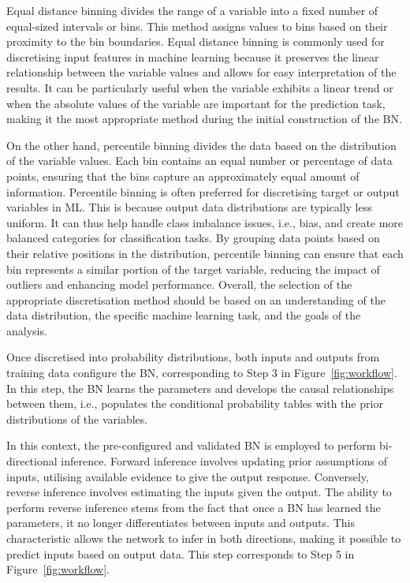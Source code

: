 \documentclass[journal]{IEEEtran}
\begin{document}
Equal distance binning divides the range of a variable into a fixed number of equal-sized intervals or bins. This method assigns values to bins based on their proximity to the bin boundaries. Equal distance binning is commonly used for discretising input features in machine learning because it preserves the linear relationship between the variable values and allows for easy interpretation of the results. It can be particularly useful when the variable exhibits a linear trend or when the absolute values of the variable are important for the prediction task, making it the most appropriate method during the initial construction of the BN. 

On the other hand, percentile binning divides the data based on the distribution of the variable values. Each bin contains an equal number or percentage of data points, ensuring that the bins capture an approximately equal amount of information. Percentile binning is often preferred for discretising target or output variables in ML. This is because output data distributions are typically less uniform. It can thus help handle class imbalance issues, i.e., bias, and create more balanced categories for classification tasks. By grouping data points based on their relative positions in the distribution, percentile binning can ensure that each bin represents a similar portion of the target variable, reducing the impact of outliers and enhancing model performance. Overall, the selection of the appropriate discretisation method should be based on an understanding of the data distribution, the specific machine learning task, and the goals of the analysis. 

Once discretised into probability distributions, both inputs and outputs from training data configure the BN, corresponding to Step 3 in Figure~\ref{fig:workflow}. In this step, the BN learns the parameters and develops the causal relationships between them, i.e., populates the conditional probability tables with the prior distributions of the variables. 

In this context, the pre-configured and validated BN is employed to perform bi-directional inference. Forward inference involves updating prior assumptions of inputs, utilising available evidence to give the output response. Conversely, reverse inference involves estimating the inputs given the output. The ability to perform reverse inference stems from the fact that once a BN has learned the parameters, it no longer differentiates between inputs and outputs. This characteristic allows the network to infer in both directions, making it possible to predict inputs based on output data. This step corresponds to Step 5 in Figure~\ref{fig:workflow}.
\end{document}
